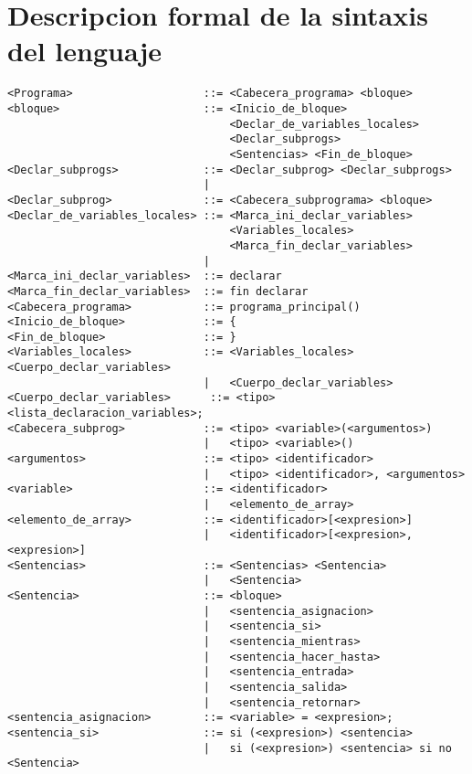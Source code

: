 \section{Descripcion formal de la sintaxis del lenguaje}

\begin{lstlisting}[breaklines=true, basicstyle=\tiny]
<Programa>                    ::= <Cabecera_programa> <bloque>
<bloque>                      ::= <Inicio_de_bloque>
                                  <Declar_de_variables_locales>
                                  <Declar_subprogs>
                                  <Sentencias> <Fin_de_bloque>
<Declar_subprogs>             ::= <Declar_subprog> <Declar_subprogs>
                              |
<Declar_subprog>              ::= <Cabecera_subprograma> <bloque>
<Declar_de_variables_locales> ::= <Marca_ini_declar_variables>
                                  <Variables_locales>
                                  <Marca_fin_declar_variables>
                              |
<Marca_ini_declar_variables>  ::= declarar
<Marca_fin_declar_variables>  ::= fin declarar
<Cabecera_programa>           ::= programa_principal()
<Inicio_de_bloque>            ::= {
<Fin_de_bloque>               ::= }
<Variables_locales>           ::= <Variables_locales> <Cuerpo_declar_variables>
                              |   <Cuerpo_declar_variables>
<Cuerpo_declar_variables>      ::= <tipo> <lista_declaracion_variables>;
<Cabecera_subprog>            ::= <tipo> <variable>(<argumentos>)
                              |   <tipo> <variable>()
<argumentos>                  ::= <tipo> <identificador>
                              |   <tipo> <identificador>, <argumentos>
<variable>                    ::= <identificador>
                              |   <elemento_de_array>
<elemento_de_array>           ::= <identificador>[<expresion>]
                              |   <identificador>[<expresion>, <expresion>]
<Sentencias>                  ::= <Sentencias> <Sentencia>
                              |   <Sentencia>
<Sentencia>                   ::= <bloque>
                              |   <sentencia_asignacion>
                              |   <sentencia_si>
                              |   <sentencia_mientras>
                              |   <sentencia_hacer_hasta>
                              |   <sentencia_entrada>
                              |   <sentencia_salida>
                              |   <sentencia_retornar>
<sentencia_asignacion>        ::= <variable> = <expresion>;
<sentencia_si>                ::= si (<expresion>) <sentencia>
                              |   si (<expresion>) <sentencia> si no <Sentencia>

\end{lstlisting}
